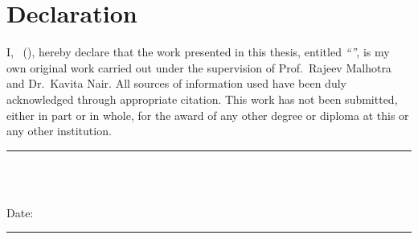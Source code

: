 \chapter*{Declaration}

\noindent I, \candidatename\ (\candidateid), hereby declare that the work presented in this thesis, entitled \textit{``\thesistitle''}, is my own original work carried out under the supervision of Prof.\ Rajeev Malhotra and Dr.\ Kavita Nair. All sources of information used have been duly acknowledged through appropriate citation. This work has not been submitted, either in part or in whole, for the award of any other degree or diploma at this or any other institution.

\vspace{1.4cm}
\noindent
\begin{minipage}[t]{0.45\textwidth}
\vspace{0pt}
{\color{bitsgray}\rule{5cm}{0.5pt}}\\[4pt]
\candidatename\\
\candidateid
\end{minipage}\hfill
\begin{minipage}[t]{0.45\textwidth}
\vspace{0pt}
{\small\color{bitsgray} Date: \rule{3cm}{0.4pt}}
\end{minipage}

